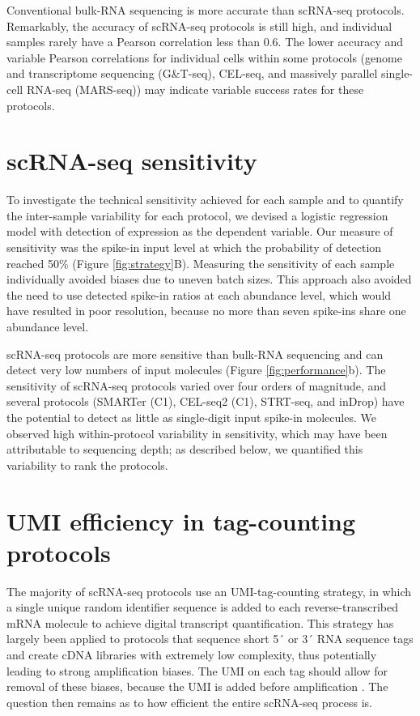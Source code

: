 Conventional bulk-RNA sequencing is more accurate than scRNA-seq protocols. Remarkably, the accuracy of scRNA-seq protocols is still high, and individual samples rarely have a Pearson correlation less than 0.6. The lower accuracy and variable Pearson correlations for individual cells within some protocols (genome and transcriptome sequencing (G\&T-seq), CEL-seq, and massively parallel single-cell RNA-seq (MARS-seq)) may indicate variable success rates for these protocols.

\section{scRNA-seq sensitivity}

To investigate the technical sensitivity achieved for each sample and to quantify the inter-sample variability for each protocol, we devised a logistic regression model with detection of expression as the dependent variable. Our measure of sensitivity was the spike-in input level at which the probability of detection reached 50\% (Figure \ref{fig:strategy}B). Measuring the sensitivity of each sample individually avoided biases due to uneven batch sizes. This approach also avoided the need to use detected spike-in ratios at each abundance level, which would have resulted in poor resolution, because no more than seven spike-ins share one abundance level.

scRNA-seq protocols are more sensitive than bulk-RNA sequencing and can detect very low numbers of input molecules (Figure \ref{fig:performance}b). The sensitivity of scRNA-seq protocols varied over four orders of magnitude, and several protocols (SMARTer (C1), CEL-seq2 (C1), STRT-seq, and inDrop) have the potential to detect as little as single-digit input spike-in molecules. We observed high within-protocol variability in sensitivity, which may have been attributable to sequencing depth; as described below, we quantified this variability to rank the protocols.

\section{UMI efficiency in tag-counting protocols}

The majority of scRNA-seq protocols use an UMI-tag-counting strategy, in which a single unique random identifier sequence is added to each reverse-transcribed mRNA molecule to achieve digital transcript quantification. This strategy has largely been applied to protocols that sequence short 5´ or 3´ RNA sequence tags and create cDNA libraries with extremely low complexity, thus potentially leading to strong amplification biases. The UMI on each tag should allow for removal of these biases, because the UMI is added before amplification  \cite{Islam2014-dx}. The question then remains as to how efficient the entire scRNA-seq process is.

